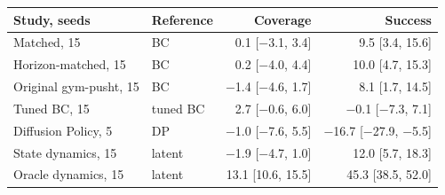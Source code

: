 \begin{tabular}{@{}llrr@{}}
\toprule
Study, seeds & Reference & Coverage & Success \\
\midrule
Matched, 15 & BC & 0.1 [\ensuremath{-}3.1, 3.4] & 9.5 [3.4, 15.6] \\
Horizon-matched, 15 & BC & 0.2 [\ensuremath{-}4.0, 4.4] & 10.0 [4.7, 15.3] \\
Original gym-pusht, 15 & BC & \ensuremath{-}1.4 [\ensuremath{-}4.6, 1.7] & 8.1 [1.7, 14.5] \\
Tuned BC, 15 & tuned BC & 2.7 [\ensuremath{-}0.6, 6.0] & \ensuremath{-}0.1 [\ensuremath{-}7.3, 7.1] \\
Diffusion Policy, 5 & DP & \ensuremath{-}1.0 [\ensuremath{-}7.6, 5.5] & \ensuremath{-}16.7 [\ensuremath{-}27.9, \ensuremath{-}5.5] \\
\midrule
State dynamics, 15 & latent & \ensuremath{-}1.9 [\ensuremath{-}4.7, 1.0] & 12.0 [5.7, 18.3] \\
Oracle dynamics, 15 & latent & 13.1 [10.6, 15.5] & 45.3 [38.5, 52.0] \\
\bottomrule
\end{tabular}
